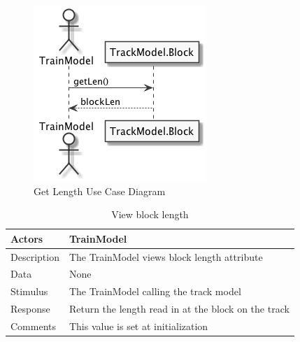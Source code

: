 \documentclass[]{article}
\begin{document}
\begin{figure}[H]
	\centering
	\includegraphics[scale=.5]{getLen.png}
	\caption{Get Length Use Case Diagram}
\end{figure}
\begin{table}[H]
	\centering
	\caption{View block length}
	\begin{tabular}{|l|l|}
		\hline
		Actors & \parbox[t]{10cm}{TrainModel} \\ \hline
		Description & \parbox[t]{10cm}{The TrainModel views block length attribute} \\ \hline
		Data &  \parbox[t]{10cm}{None} \\ \hline
		Stimulus &  \parbox[t]{10cm}{The TrainModel calling the track model} \\ \hline
		Response & \parbox[t]{10cm}{Return the length read in at the block on the track}\\ \hline
		Comments & \parbox[t]{10cm}{This value is set at initialization}  \\ \hline
	\end{tabular}
\end{table}
\end{document}
